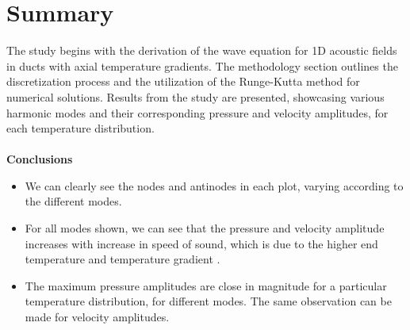 \documentclass[8pt]{article} %
\begin{document}
\section{Summary}
 The study begins with the derivation of the wave equation for 1D acoustic fields in ducts with axial temperature gradients. The methodology section outlines the discretization process and the utilization of the Runge-Kutta method for numerical solutions. Results from the study are presented, showcasing various harmonic modes and their corresponding pressure and velocity amplitudes, for each temperature distribution.\\\\
\textbf{Conclusions} 
\begin{itemize}
	\item We can clearly see the nodes and antinodes in each plot, varying according to the different modes.
	\item For all modes shown, we can see that the pressure and velocity amplitude increases with increase in speed of sound, which is due to the higher end temperature and temperature gradient .
	\item The maximum pressure amplitudes are close in magnitude for a particular temperature distribution, for different modes. The same observation can be made for velocity amplitudes.
\end{itemize}

\newpage
\end{document}
